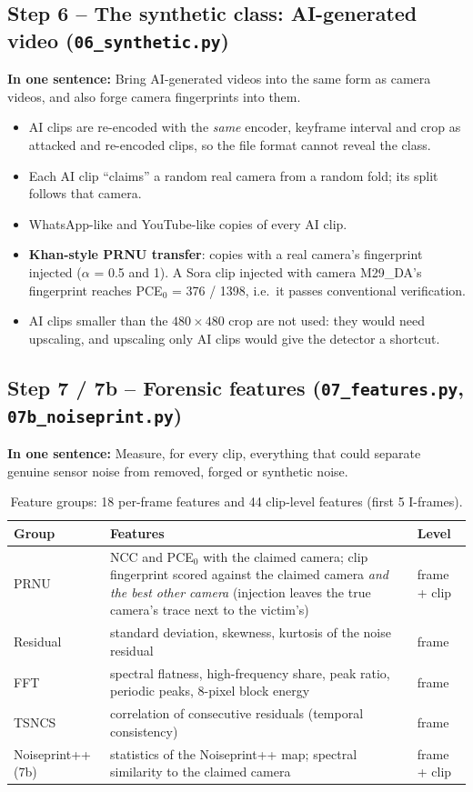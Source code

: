 \documentclass[11pt,a4paper]{article}
\newcommand{\say}[1]{\begin{onesentence}\small\textbf{In one sentence:} #1\end{onesentence}}
\begin{document}
\subsection{Step 6 -- The synthetic class: AI-generated video (\texttt{06\_synthetic.py})}
\say{Bring AI-generated videos into the same form as camera videos, and also forge camera fingerprints into them.}
\begin{itemize}
\item AI clips are re-encoded with the \emph{same} encoder, keyframe interval and crop as attacked and re-encoded clips, so
      the file format cannot reveal the class.
\item Each AI clip ``claims'' a random real camera from a random fold; its split follows that camera.
\item WhatsApp-like and YouTube-like copies of every AI clip.
\item \textbf{Khan-style PRNU transfer}: copies with a real camera's fingerprint injected ($\alpha$ = 0.5 and 1). A Sora clip
      injected with camera M29\_DA's fingerprint reaches PCE$_0$ = 376 / 1398, i.e.\ it passes conventional verification.
\item AI clips smaller than the $480\times480$ crop are not used: they would need upscaling, and upscaling only AI clips would
      give the detector a shortcut.
\end{itemize}

\subsection{Step 7 / 7b -- Forensic features (\texttt{07\_features.py}, \texttt{07b\_noiseprint.py})}
\say{Measure, for every clip, everything that could separate genuine sensor noise from removed, forged or synthetic noise.}
\begin{table}[H]\centering\small
\begin{tabularx}{\linewidth}{lYl}\toprule
Group & Features & Level \\\midrule
PRNU & NCC and PCE$_0$ with the claimed camera; clip fingerprint scored against the claimed camera \emph{and the best other
       camera} (injection leaves the true camera's trace next to the victim's) & frame + clip \\
Residual & standard deviation, skewness, kurtosis of the noise residual & frame \\
FFT & spectral flatness, high-frequency share, peak ratio, periodic peaks, 8-pixel block energy & frame \\
TSNCS & correlation of consecutive residuals (temporal consistency) & frame \\
Noiseprint++ (7b) & statistics of the Noiseprint++ map; spectral similarity to the claimed camera & frame + clip \\\bottomrule
\end{tabularx}\caption{Feature groups: 18 per-frame features and 44 clip-level features (first 5 I-frames).}\end{table}
\end{document}
